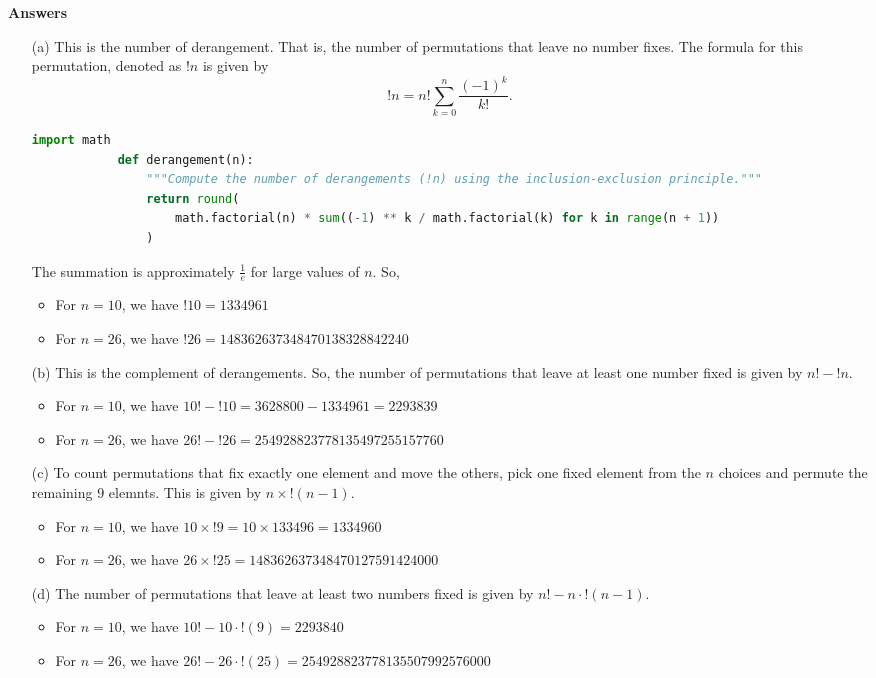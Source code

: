 \documentclass[12pt]{ut-thesis}
\theoremstyle{definition}
\begin{document}
	\textbf{Answers}
	\begin{itemize}
		\item[(a)]This is the number of derangement. That is, the number of permutations that leave no number fixes. 
		The formula for this permutation, denoted as $!n$ is given by
		\[ !n = n! \sum_{k=0}^{n} \frac{(-1)^k}{k!} .\]
		
		\begin{lstlisting}[language=Python, caption=Exercise 5.9 (a)- Derangement python Implementation]
			import math
			def derangement(n):
				"""Compute the number of derangements (!n) using the inclusion-exclusion principle."""
				return round(
					math.factorial(n) * sum((-1) ** k / math.factorial(k) for k in range(n + 1))
				)
		\end{lstlisting}

		The summation is approximately $\frac{1}{e}$ for large values of $n$. So,
		\begin{itemize}
			\item For $n=10$, we have $!10 = 1334961$ 
			\item For $n=26$, we have $!26 = 148362637348470138328842240$
		\end{itemize}
		\item[(b)] This is the complement of derangements. So, the number of permutations that leave at least 
		one number fixed is given by $n! - !n$.
		\begin{itemize}
			\item For $n=10$, we have $10! - !10 = 3628800 - 1334961 = 2293839$ 
			\item For $n=26$, we have $26! - !26  = 254928823778135497255157760$
		\end{itemize}
		\item[(c)] To count permutations that fix exactly one element and move the others, pick one fixed element from the $n$
		choices and permute the remaining 9 elemnts. This is given by $n \times !(n-1).$
		\begin{itemize}
			\item For $n=10$, we have $10 \times !9 = 10 \times 133496 = 1334960$ 
			\item For $n=26$, we have $26 \times !25 = 148362637348470127591424000$
		\end{itemize}
		\item[(d)] The number of permutations that leave at least two numbers fixed is given by $ n! - n \cdot !(n-1).$
		\item[] \begin{itemize}
			\item For $n=10$, we have $10! - 10 \cdot !(9)  = 2293840$ 
			\item For $n=26$, we have $26! - 26 \cdot !(25) =  254928823778135507992576000$
		\end{itemize}
	\end{itemize}
\end{document}

